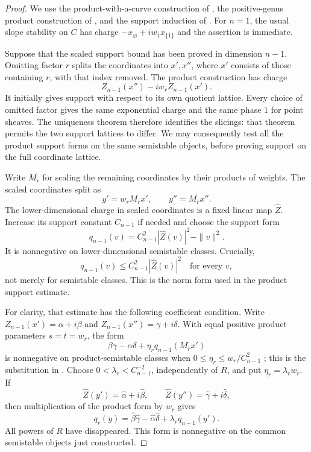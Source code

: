 \begin{proof}
We use the product-with-a-curve construction of
\cite[Lemma~5.7 and Remark~5.8]{LiuProduct2021}, the positive-genus
product construction of \cite[Theorem~4.5]{ProductsCurves2025}, and
the support induction of \cite[Lemma~6.6]{LiEtAl2026}.
For $n=1$, the usual slope stability on $C$ has charge
$-x_{\varnothing}+iw_1x_{\{1\}}$ and the assertion is immediate.

Suppose that the scaled support bound has been proved in dimension
$n-1$.  Omitting factor $r$ splits the coordinates into $x',x''$,
where $x'$ consists of those containing $r$, with that index removed.
The product construction has charge
\[
 Z_{n-1}(x'')-iw_rZ_{n-1}(x').
\]
It initially gives support with respect to its own quotient lattice.
Every choice of omitted factor gives the same exponential charge and
the same phase $1$ for point sheaves.  The uniqueness theorem
\cite[Theorem~3.11]{ProductsCurves2025} therefore identifies the
slicings: that theorem permits the two support lattices to differ.
We may consequently test all the product support forms on the same
semistable objects, before proving support on the full coordinate
lattice.

Write $M_{\widehat r}$ for scaling the remaining coordinates by their
products of weights.  The scaled coordinates split as
\[
 y'=w_rM_{\widehat r}x',\qquad y''=M_{\widehat r}x''.
\]
The lower-dimensional charge in scaled coordinates is a fixed linear
map $\widehat Z$.  Increase its support constant $C_{n-1}$ if needed
and choose the support form
\begin{equation}\label{eq:elliptic-support-form}
 q_{n-1}(v)=C_{n-1}^2|\widehat Z(v)|^2-\|v\|^2.
\end{equation}
It is nonnegative on lower-dimensional semistable classes.  Crucially,
\[
 q_{n-1}(v)\le C_{n-1}^2|\widehat Z(v)|^2
 \quad\text{for every }v,
\]
not merely for semistable classes.  This is the norm form used in the
product support estimate.

For clarity, that estimate has the following coefficient condition.
Write $Z_{n-1}(x')=\alpha+i\beta$ and
$Z_{n-1}(x'')=\gamma+i\delta$.  With equal positive product parameters
$s=t=w_r$, the form
\[
 \beta\gamma-\alpha\delta
       +\eta_r q_{n-1}(M_{\widehat r}x')
\]
is nonnegative on product-semistable classes when
$0\le\eta_r\le w_r/C_{n-1}^2$
\cite[Lemma~5.7]{LiuProduct2021}; this is the substitution in
\cite[Lemma~6.6]{LiEtAl2026}.
Choose $0<\lambda_r<C_{n-1}^{-2}$, independently of $R$, and put
$\eta_r=\lambda_rw_r$.  If
\[
 \widehat Z(y')=\widehat\alpha+i\widehat\beta,
 \qquad \widehat Z(y'')=\widehat\gamma+i\widehat\delta,
\]
then multiplication of the product form by $w_r$ gives
\begin{equation}\label{eq:weighted-product-form}
 q_r(y)=\widehat\beta\widehat\gamma
       -\widehat\alpha\widehat\delta
       +\lambda_rq_{n-1}(y').
\end{equation}
All powers of $R$ have disappeared.  This form is nonnegative on the
common semistable objects just constructed.


\end{proof}
